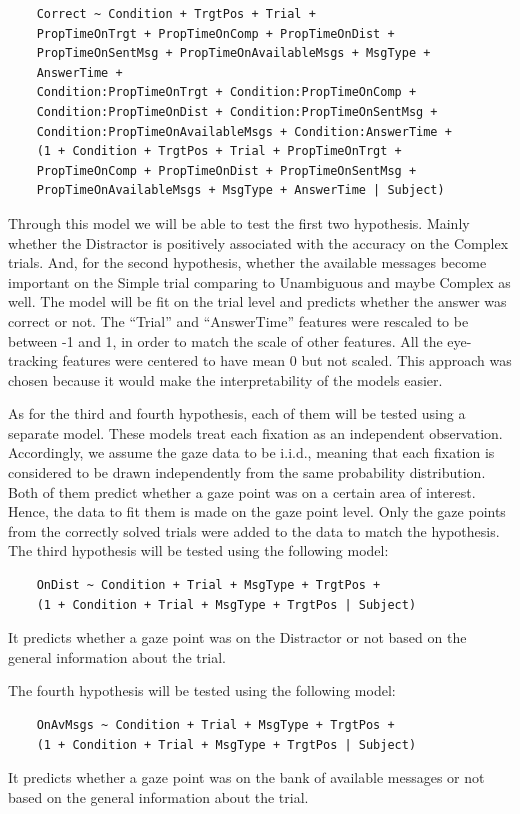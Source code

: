 \begin{verbatim}
    Correct ~ Condition + TrgtPos + Trial + 
    PropTimeOnTrgt + PropTimeOnComp + PropTimeOnDist + 
    PropTimeOnSentMsg + PropTimeOnAvailableMsgs + MsgType +
    AnswerTime +
    Condition:PropTimeOnTrgt + Condition:PropTimeOnComp +
    Condition:PropTimeOnDist + Condition:PropTimeOnSentMsg +
    Condition:PropTimeOnAvailableMsgs + Condition:AnswerTime +
    (1 + Condition + TrgtPos + Trial + PropTimeOnTrgt + 
    PropTimeOnComp + PropTimeOnDist + PropTimeOnSentMsg + 
    PropTimeOnAvailableMsgs + MsgType + AnswerTime | Subject)
\end{verbatim}

Through this model we will be able to test the first two hypothesis. Mainly whether the Distractor is positively associated with the accuracy on the Complex trials. And, for the second hypothesis, whether the available messages become important on the Simple trial comparing to Unambiguous and maybe Complex as well. The model will be fit on the trial level and predicts whether the answer was correct or not. The ``Trial'' and ``AnswerTime'' features were rescaled to be between -1 and 1, in order to match the scale of other features. All the eye-tracking features were centered to have mean 0 but not scaled. This approach was chosen because it would make the interpretability of the models easier.

As for the third and fourth hypothesis, each of them will be tested using a separate model. These models treat each fixation as an independent observation. Accordingly, we assume the gaze data to be i.i.d., meaning that each fixation is considered to be drawn independently from the same probability distribution. Both of them predict whether a gaze point was on a certain area of interest. Hence, the data to fit them is made on the gaze point level. Only the gaze points from the correctly solved trials were added to the data to match the hypothesis. The third hypothesis will be tested using the following model:
\begin{verbatim}
    OnDist ~ Condition + Trial + MsgType + TrgtPos +
    (1 + Condition + Trial + MsgType + TrgtPos | Subject)
\end{verbatim}
It predicts whether a gaze point was on the Distractor or not based on the general information about the trial. 

The fourth hypothesis will be tested using the following model:
\begin{verbatim}
    OnAvMsgs ~ Condition + Trial + MsgType + TrgtPos +
    (1 + Condition + Trial + MsgType + TrgtPos | Subject)
\end{verbatim}
It predicts whether a gaze point was on the bank of available messages or not based on the general information about the trial. 

